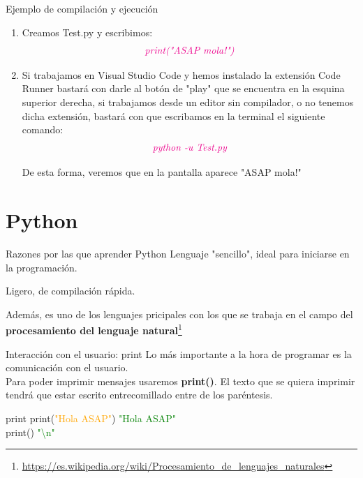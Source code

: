 \documentclass{beamer}
\begin{document}
\begin{frame}{Ejemplo de compilación y ejecución}
\begin{enumerate}
\item Creamos Test.py y escribimos: 
\begin{gather}
\color{magenta}\textit{print("ASAP mola!")}
\end{gather}
\item Si trabajamos en Visual Studio Code y hemos instalado la extensión Code Runner bastará con darle al botón de "play" que se encuentra en la esquina superior derecha, si trabajamos desde un editor sin compilador, o no tenemos dicha extensión, bastará con que escribamos en la terminal el siguiente comando:
\begin{gather}
\color{magenta}\textit{python -u Test.py}
\end{gather}

De esta forma, veremos que en la pantalla aparece "ASAP mola!"
\end{enumerate}
\end{frame}

\section{Python}

\begin{frame}{Razones por las que aprender Python}
\setlength{\parskip}{8mm} %
Lenguaje "sencillo", ideal para iniciarse en la programación.

Ligero, de compilación rápida.

Además, es uno de los lenguajes pricipales con los que se trabaja en el campo del \textbf{procesamiento del lenguaje natural}\footnote{\url{https://es.wikipedia.org/wiki/Procesamiento_de_lenguajes_naturales}}
\end{frame}

\begin{frame}{Interacción con el usuario: print}
Lo más importante a la hora de programar es la comunicación con el usuario.\\
Para poder imprimir mensajes usaremos \textbf{print()}. El texto que se quiera imprimir tendrá que estar escrito entrecomillado entre de los paréntesis.
\begin{Programexample}{print}
print(\textcolor{orange}{"Hola ASAP"}) \hspace{2cm}\textcolor{green}{"Hola ASAP"}\\
print() \hspace{4.1cm}\textcolor{green}{"\textbackslash n"}
\end{Programexample}
\end{frame}
\end{document}
